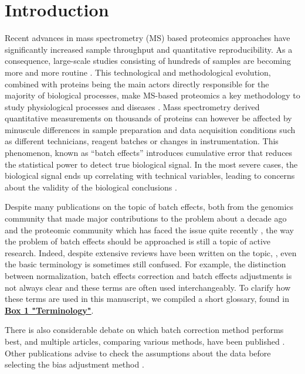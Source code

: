 \documentclass[num-refs]{wiley-article}
\begin{document}
\section{Introduction}

Recent advances in mass spectrometry (MS) based proteomics approaches have significantly increased sample throughput and quantitative reproducibility. As a consequence, large-scale studies consisting of hundreds of samples are becoming more and more routine \cite{ Williams:2016aa, Liu2015, Sajic2018, Okada2016, Collins2017, mertins2016proteogenomics, zhang2014proteogenomic, zhang2016integrated}. This technological and methodological evolution, combined with proteins being the main actors directly responsible for the majority of biological processes, make MS-based proteomics  a key methodology to study physiological processes and diseases \cite{Schubert2017}. Mass spectrometry derived quantitative measurements on thousands of proteins can however be affected by minuscule differences in sample preparation and data acquisition conditions such as different technicians, reagent batches or changes in instrumentation. This phenomenon, known as “batch effects” introduces cumulative error that reduces the statistical power to detect true biological signal. In the most severe cases, the biological signal ends up correlating with technical variables, leading to concerns about the validity of the biological conclusions \cite{Leek:2010aa, Akey:2007aa, Baggerly:2004aa, Petricoin:2002aa}.

Despite many publications on the topic of batch effects, both from the genomics community that made major contributions to the problem about a decade ago \cite{Leek:2010aa, Lazar:2013aa, Luo2010, Chen:2011ac, Dillies:2013aa, Chawade:2014aa} and the proteomic community which has faced the issue quite recently \cite{Karpievitch2012, Chawade:2014aa, Valikangas2018, Gregori2012}, the way the problem of batch effects should be approached is still a topic of active research. Indeed, despite extensive reviews have been written on the topic, \cite{Lazar:2013aa, Leek:2010aa}, even the basic terminology is sometimes still confused. For example, the distinction between normalization, batch effects correction and batch effects adjustments is not always clear and these terms are often used interchangeably. To clarify how these terms are used in this manuscript, we compiled a short glossary, found in \textbf{\hyperref[box:Box1_definitions]{Box 1 "Terminology"}}. 

There is also considerable debate on which batch correction method performs best, and multiple articles, comparing various methods, have been published \cite{Luo2010, Chen:2011ac, Chawade:2014aa}. Other publications advise to check the assumptions about the data before selecting the bias adjustment method \cite{Evans:2018aa, GOH2017498}. 
\end{document}
